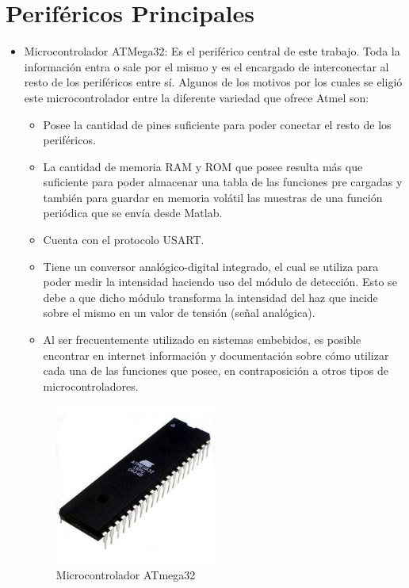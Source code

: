 \section{Periféricos Principales}
\label{sec:perif}

\begin{itemize}
\item Microcontrolador ATMega32: Es el periférico central de este trabajo. Toda la información entra o sale por el mismo y es el encargado de interconectar al resto de los periféricos entre sí. Algunos de los motivos por los cuales se eligió este microcontrolador entre la diferente variedad que ofrece Atmel son:

\begin{itemize}
\item Posee la cantidad de pines suficiente para poder conectar el resto de los periféricos.
\item La cantidad de memoria RAM y ROM que posee resulta más que suficiente para poder almacenar una tabla de las funciones pre cargadas y también para guardar en memoria volátil las muestras de una función periódica que se envía desde Matlab.
\item Cuenta con el protocolo USART.
\item Tiene un conversor analógico-digital integrado, el cual se utiliza para poder medir la intensidad haciendo uso del módulo de detección. Esto se debe a que dicho módulo transforma la intensidad del haz que incide sobre el mismo en un valor de tensión (señal analógica).
\item Al ser frecuentemente utilizado en sistemas embebidos, es posible encontrar en internet información y documentación sobre cómo utilizar cada una de las funciones que posee, en contraposición a otros tipos de microcontroladores.
\end{itemize}

\begin{figure}[H]
  \centering
  \includegraphics[width=0.5\textwidth]{images/atmega32.jpg}
  \caption{Microcontrolador ATmega32}
  \label{fig:atmega32}
\end{figure}


\end{itemize}
